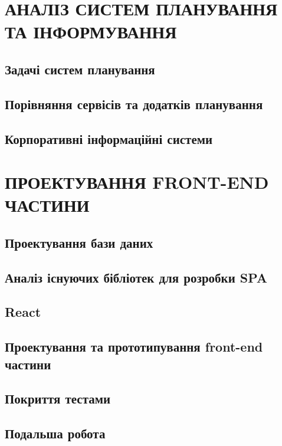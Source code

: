 \documentclass[a4paper,14pt]{extarticle} %
\begin{document}


\tableofcontents %
\clearpage


\section{АНАЛІЗ СИСТЕМ ПЛАНУВАННЯ ТА ІНФОРМУВАННЯ}
\subsection{Задачі систем планування} 

\subsection{Порівняння сервісів та додатків планування} 





\subsection{Корпоративні інформаційні системи} 



\section{ПРОЕКТУВАННЯ FRONT-END ЧАСТИНИ}
\subsection{Проектування бази даних}






\subsection{Аналіз існуючих бібліотек для розробки SPA}


\subsection{React}


\subsection{Проектування та прототипування front-end частини}





\subsection{Покриття тестами}




\subsection{Подальша робота}


\end{document}
